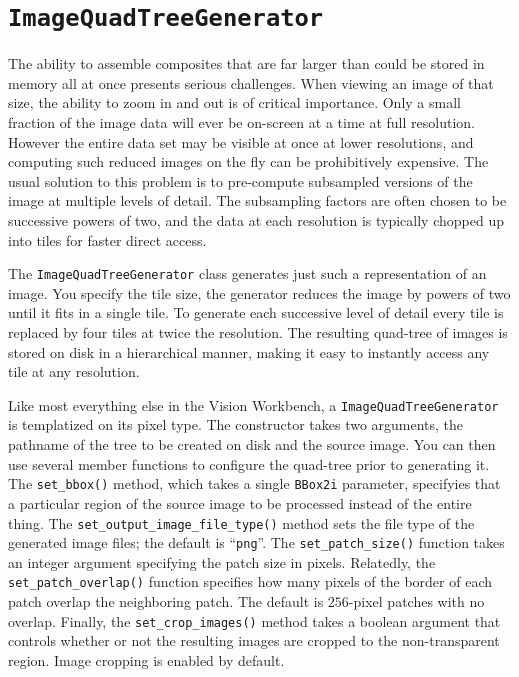 \section{{\tt ImageQuadTreeGenerator}}\label{sec:quadtreegenerator}

The ability to assemble composites that are far larger than could be stored 
in memory all at once presents serious challenges.  When viewing an image 
of that size, the ability to zoom in and out is of critical importance.  
Only a small fraction of the image data will ever be on-screen at a time 
at full resolution.  However the entire data set may be visible at once at 
lower resolutions, and computing such reduced images on the fly can be 
prohibitively expensive.  The usual solution to this problem is to 
pre-compute subsampled versions of the image at multiple levels of detail. 
The subsampling factors are often chosen to be successive powers of two, 
and the data at each resolution is typically chopped up into tiles for 
faster direct access.

The \verb#ImageQuadTreeGenerator# class generates just such a representation 
of an image.  You specify the tile size, the generator reduces the 
image by powers of two until it fits in a single tile.  To generate 
each successive level of detail every tile is replaced by four tiles 
at twice the resolution.  The resulting quad-tree of images is stored 
on disk in a hierarchical manner, making it easy to instantly access any 
tile at any resolution.

Like most everything else in the Vision Workbench, a \verb#ImageQuadTreeGenerator# 
is templatized on its pixel type.  The constructor takes two arguments, 
the pathname of the tree to be created on disk and the source image. 
You can then use several member functions to configure the quad-tree 
prior to generating it.  The \verb#set_bbox()# method, which takes a 
single \verb#BBox2i# parameter, specifyies that a particular region of 
the source image to be processed instead of the entire thing.  The 
\verb#set_output_image_file_type()# method sets the file type of the 
generated image files; the default is ``\verb#png#''.  The 
\verb#set_patch_size()# function takes an integer argument specifying 
the patch size in pixels.  Relatedly, the \verb#set_patch_overlap()# 
function specifies how many pixels of the border of each patch overlap 
the neighboring patch.  The default is $256$-pixel patches with no 
overlap.  Finally, the \verb#set_crop_images()# method takes a 
boolean argument that controls whether or not the resulting images 
are cropped to the non-transparent region.  Image cropping is enabled 
by default.


